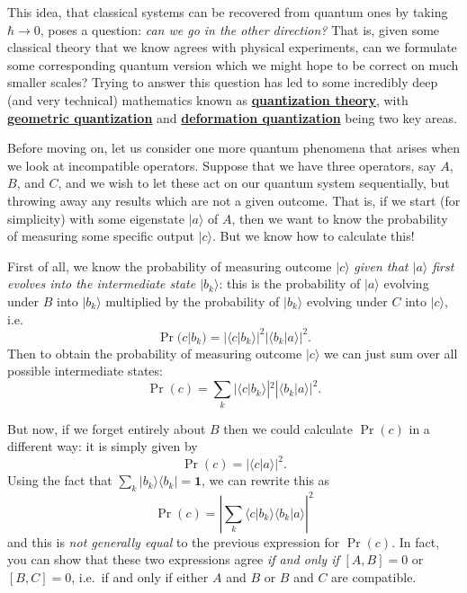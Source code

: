 \documentclass[fleqn]{article}
\newenvironment{technical}{\noindent}{\medskip}
\begin{document}
\begin{technical}
This idea, that classical systems can be recovered from quantum ones by taking \(\hbar\to0\), poses a question: \emph{can we go in the other direction?}
That is, given some classical theory that we know agrees with physical experiments, can we formulate some corresponding quantum version which we might hope to be correct on much smaller scales?
Trying to answer this question has led to some incredibly deep (and very technical) mathematics known as \href{https://en.wikipedia.org/wiki/Quantization_(physics)}{\textbf{quantization theory}}, with \href{https://en.wikipedia.org/wiki/Geometric_quantization}{\textbf{geometric quantization}} and \href{https://en.wikipedia.org/wiki/Wigner\%E2\%80\%93Weyl_transform\#Deformation_quantization}{\textbf{deformation quantization}} being two key areas.

\end{technical}

Before moving on, let us consider one more quantum phenomena that arises when we look at incompatible operators.
Suppose that we have three operators, say \(A\), \(B\), and \(C\), and we wish to let these act on our quantum system sequentially, but throwing away any results which are not a given outcome.
That is, if we start (for simplicity) with some eigenstate \(|a\rangle\) of \(A\), then we want to know the probability of measuring some specific output \(|c\rangle\).
But we know how to calculate this!

First of all, we know the probability of measuring outcome \(|c\rangle\) \emph{given that \(|a\rangle\) first evolves into the intermediate state \(|b_k\rangle\)}: this is the probability of \(|a\rangle\) evolving under \(B\) into \(|b_k\rangle\) multiplied by the probability of \(|b_k\rangle\) evolving under \(C\) into \(|c\rangle\), i.e.
\[
  \Pr(c|b_k) = |\langle c|b_k\rangle|^2|\langle b_k|a\rangle|^2.
\]
Then to obtain the probability of measuring outcome \(|c\rangle\) we can just sum over all possible intermediate states:
\[
  \Pr(c) = \sum_{k}|\langle c|b_k\rangle|^2|\langle b_k|a\rangle|^2.
\]

But now, if we forget entirely about \(B\) then we could calculate \(\Pr(c)\) in a different way: it is simply given by
\[
  \Pr(c) = |\langle c|a\rangle|^2.
\]
Using the fact that \(\sum_{k}|b_k\rangle\langle b_k|=\mathbf{1}\), we can rewrite this as
\[
  \Pr(c) = \left|\sum_k\langle c|b_k\rangle\langle b_k|a\rangle\right|^2
\]
and this is \emph{not generally equal} to the previous expression for \(\Pr(c)\).
In fact, you can show that these two expressions agree \emph{if and only if} \([A,B]=0\) or \([B,C]=0\), i.e.~if and only if either \(A\) and \(B\) or \(B\) and \(C\) are compatible.
\end{document}
